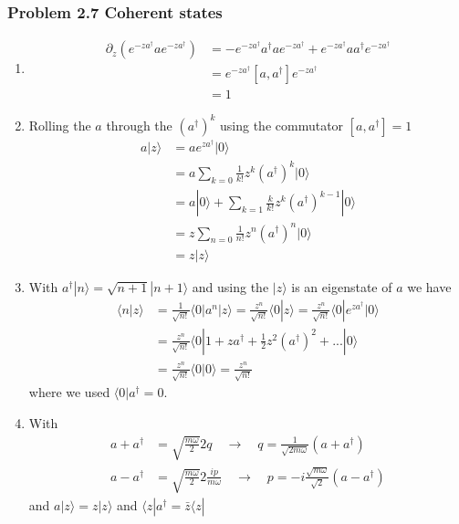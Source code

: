 \documentclass[10pt,a4paper]{article}
\theoremstyle{definition}
\begin{document}
\subsubsection{Problem 2.7 Coherent states}
\begin{enumerate}
\item 
\begin{align}
    \partial_z\left(e^{-za^\dagger} a e^{-za^\dagger}\right)
    &=-e^{-za^\dagger}a^\dagger a e^{-za^\dagger}+e^{-za^\dagger} a a^\dagger e^{-za^\dagger}\\
    &=e^{-za^\dagger} [a,a^\dagger] e^{-za^\dagger}\\
    &=1
\end{align}
\item Rolling the $a$ through the $(a^\dagger)^k$ using the commutator $[a,a^\dagger]=1$
\begin{align}
    a|z\rangle
    &=a e^{za^\dagger}|0\rangle\\
    &=a\sum_{k=0}\frac{1}{k!}z^k(a^\dagger)^k|0\rangle\\
    &=a|0\rangle+\sum_{k=1}\frac{k}{k!}z^k(a^\dagger)^{k-1}|0\rangle\\
    &=z\sum_{n=0}\frac{1}{n!}z^n(a^\dagger)^{n}|0\rangle\\
    &=z|z\rangle
\end{align}
\item With $a^\dagger|n\rangle=\sqrt{n+1}|n+1\rangle$ and using the $|z\rangle$ is an eigenstate of $a$ we have
\begin{align}
    \langle n|z\rangle&=\frac{1}{\sqrt{n!}}\langle0|a^n|z\rangle
    =\frac{z^n}{\sqrt{n!}}\langle0|z\rangle
    =\frac{z^n}{\sqrt{n!}}\langle0|e^{za^\dagger}|0\rangle\\
    &=\frac{z^n}{\sqrt{n!}}\langle0|1+za^\dagger+\frac{1}{2}z^2(a^\dagger)^2+...|0\rangle\\
    &=\frac{z^n}{\sqrt{n!}}\langle0|0\rangle
    =\frac{z^n}{\sqrt{n!}}
\end{align}
where we used $\langle0|a^\dagger=0$.
\item With
\begin{align}
    a+a^\dagger&=\sqrt{\frac{m\omega}{2}}2q\quad\rightarrow\quad q=\frac{1}{\sqrt{2m\omega}}(a+a^\dagger)\\
    a-a^\dagger&=\sqrt{\frac{m\omega}{2}}2\frac{ip}{m\omega}\quad\rightarrow\quad p=-i\frac{\sqrt{m\omega}}{\sqrt{2}}(a-a^\dagger)
\end{align}
and $a|z\rangle=z|z\rangle$ and $\langle z|a^\dagger=\bar{z}\langle z|$ 
\begin{align}

\end{align}
\end{enumerate}
\end{document}
